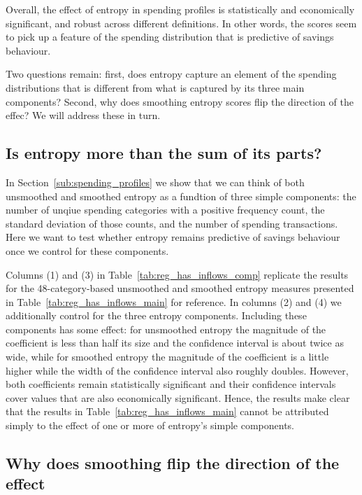 Overall, the effect of entropy in spending profiles is statistically and
economically significant, and robust across different definitions. In other
words, the scores seem to pick up a feature of the spending distribution that
is predictive of savings behaviour.

Two questions remain: first, does entropy capture an element of the spending
distributions that is different from what is captured by its three main
components? Second, why does smoothing entropy scores flip the direction of the
effec? We will address these in turn.


\subsection{Is entropy more than the sum of its parts?}%
\label{sub:is_entropy_more_than_the_sum_of_its_parts_}

In Section~\ref{sub:spending_profiles} we show that we can think of both
unsmoothed and smoothed entropy as a fundtion of three simple components: the
number of unqiue spending categories with a positive frequency count, the
standard deviation of those counts, and the number of spending transactions.
Here we want to test whether entropy remains predictive of savings behaviour
once we control for these components.



Columns (1) and (3) in Table~\ref{tab:reg_has_inflows_comp} replicate the
results for the 48-category-based unsmoothed and smoothed entropy measures
presented in Table~\ref{tab:reg_has_inflows_main} for reference. In columns (2)
and (4) we additionally control for the three entropy components. Including
these components has some effect: for unsmoothed entropy the magnitude of the
coefficient is less than half its size and the confidence interval is about
twice as wide, while for smoothed entropy the magnitude of the coefficient is a
little higher while the width of the confidence interval also roughly doubles.
However, both coefficients remain statistically significant and their
confidence intervals cover values that are also economically significant.
Hence, the results make clear that the results in
Table~\ref{tab:reg_has_inflows_main} cannot be attributed simply to the effect
of one or more of entropy's simple components.


\subsection{Why does smoothing flip the direction of the effect}%
\label{sub:why_does_smoothing_flip_the_direction_of_the_effect}

